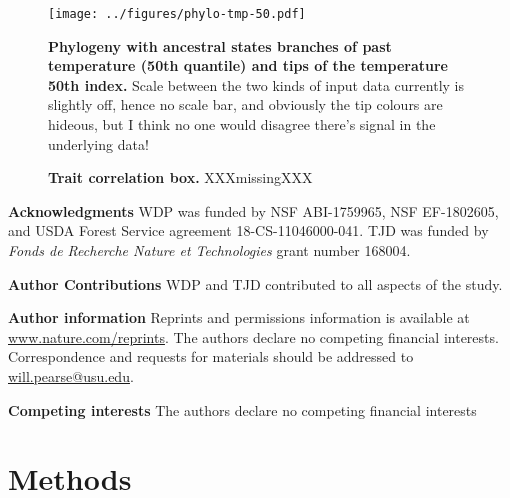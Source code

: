 \documentclass[12pt]{report}
\begin{document}
\begin{figure}[h!]
  \begin{center}
    \texttt{[image: ../figures/phylo-tmp-50.pdf]}
  \end{center}
  \caption{\doublespacing \textbf{Phylogeny with ancestral states
      branches of past temperature (50th quantile) and tips of the
      temperature 50th index.} Scale between the two kinds of input
    data currently is slightly off, hence no scale bar, and obviously
    the tip colours are hideous, but I think no one would disagree
    there's signal in the underlying data!}
  \label{pca}
\end{figure}


\begin{figure}[h!]
  \begin{center}
  \end{center}
  \caption{\doublespacing \textbf{Trait correlation box.}
    XXXmissingXXX}
  \label{traits}
\end{figure}

\clearpage

\textbf{Acknowledgments} WDP was funded by NSF ABI-1759965, NSF
EF-1802605, and USDA Forest Service agreement 18-CS-11046000-041. TJD
was funded by \emph{Fonds de Recherche Nature et Technologies} grant
number 168004.

\textbf{Author Contributions} WDP and TJD contributed to all aspects
of the study.

\textbf{Author information} Reprints and permissions information is
available at \url{www.nature.com/reprints}. The authors declare no
competing financial interests. Correspondence and requests for
materials should be addressed to \url{will.pearse@usu.edu}.

\textbf{Competing interests} The authors declare no competing
financial interests

\clearpage

\section*{\Large Methods}

\printbibliography
\end{document}
